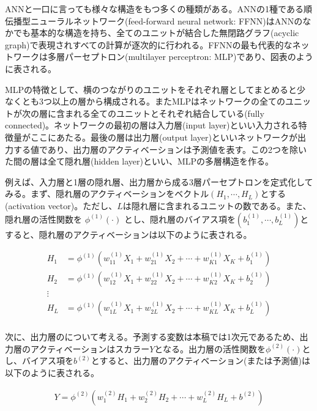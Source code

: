 \documentclass[a4paper, 12pt]{jsreport}
\begin{document}
ANNと一口に言っても様々な構造をもつ多くの種類がある。ANNの1種である順伝播型ニューラルネットワーク(feed-forward neural network: FFNN)はANNのなかでも基本的な構造を持ち、全てのユニットが結合した無閉路グラフ(acyclic graph)で表現されすべての計算が逐次的に行われる。FFNNの最も代表的なネットワークは多層パーセプトロン(multilayer perceptron: MLP)であり、図表のように表される。


MLPの特徴として、横のつながりのユニットをそれぞれ層としてまとめると少なくとも3つ以上の層から構成される。またMLPはネットワークの全てのユニットが次の層に含まれる全てのユニットとそれぞれ結合している(fully connected)。ネットワークの最初の層は入力層(input layer)といい入力される特徴量がここにあたる。最後の層は出力層(output layer)といいネットワークが出力する値であり、出力層のアクティベーションは予測値を表す。この2つを除いた間の層は全て隠れ層(hidden layer)といい、MLPの多層構造を作る。

例えば、入力層と1層の隠れ層、出力層から成る3層パーセプトロンを定式化してみる。まず、隠れ層のアクティベーションをベクトル$(H_1, \cdots, H_L)$とする(activation vector)。ただし、$L$は隠れ層に含まれるユニットの数である。また、隠れ層の活性関数を $\phi^{(1)}(\cdot)$ とし、隠れ層のバイアス項を$(b^{(1)}_1, \cdots, b^{(1)}_L)$とすると、隠れ層のアクティベーションは以下のように表される。

\begin{equation}
  \begin{split}
    H_1 &= \phi^{(1)}(w^{(1)}_{11} X_1 + w^{(1)}_{21} X_2 + \cdots + w^{(1)}_{K1} X_K + b^{(1)}_1) \\
    H_2 &= \phi^{(1)}(w^{(1)}_{12} X_1 + w^{(1)}_{22} X_2 + \cdots + w^{(1)}_{K2} X_K + b^{(1)}_2) \\
    \vdots \\
    H_L &= \phi^{(1)}(w^{(1)}_{1L} X_1 + w^{(1)}_{2L} X_2 + \cdots + w^{(1)}_{KL} X_K + b^{(1)}_L) \\
  \end{split}
\end{equation}

 次に、出力層のについて考える。予測する変数は本稿では1次元であるため、出力層のアクティベーションはスカラー$Y$となる。出力層の活性関数を$\phi^{(2)}(\cdot)$とし、バイアス項を$b^{(2)}$とすると、出力層のアクティベーション(または予測値)は以下のように表される。

\begin{equation}
  \begin{split}
    Y = \phi^{(2)}(w^{(2)}_{1} H_1 + w^{(2)}_{2} H_2 + \cdots + w^{(2)}_{L} H_L + b^{(2)})
  \end{split}
\end{equation}
\end{document}
